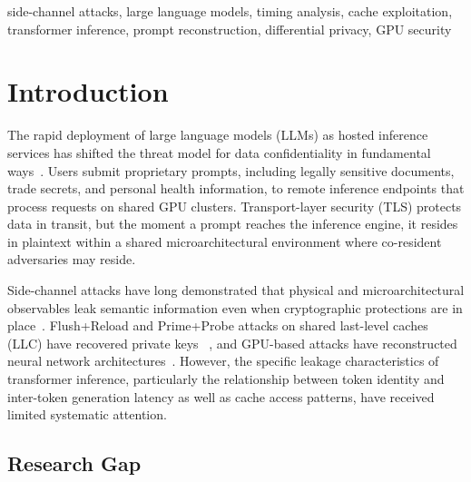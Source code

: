 \documentclass[conference,10pt,twocolumn]{IEEEtran}
\begin{document}
\begin{IEEEkeywords}
side-channel attacks, large language models, timing analysis,
cache exploitation, transformer inference, prompt reconstruction,
differential privacy, GPU security
\end{IEEEkeywords}

\section{Introduction}
\label{sec:intro}

The rapid deployment of large language models (LLMs) as hosted
inference services has shifted the threat model for data
confidentiality in fundamental ways~\cite{yi2024survey,
duan2024llmsec}. Users submit proprietary prompts, including
legally sensitive documents, trade secrets, and personal health
information, to remote inference endpoints that process requests
on shared GPU clusters. Transport-layer security (TLS) protects
data in transit, but the moment a prompt reaches the inference
engine, it resides in plaintext within a shared microarchitectural
environment where co-resident adversaries may reside.

Side-channel attacks have long demonstrated that physical and
microarchitectural observables leak semantic information even
when cryptographic protections are in place~\cite{kocher1996timing,
brumley2003remote}. Flush+Reload and Prime+Probe attacks on
shared last-level caches (LLC) have recovered private keys
~\cite{yarom2014flush,liu2015last,gruss2016flushflush}, and
GPU-based attacks have reconstructed neural network
architectures~\cite{ramesh2024profiling,yan2020cache}.
However, the specific leakage characteristics of transformer
inference, particularly the relationship between token identity
and inter-token generation latency as well as cache access
patterns, have received limited systematic attention.

\subsection*{Research Gap}
\end{document}
